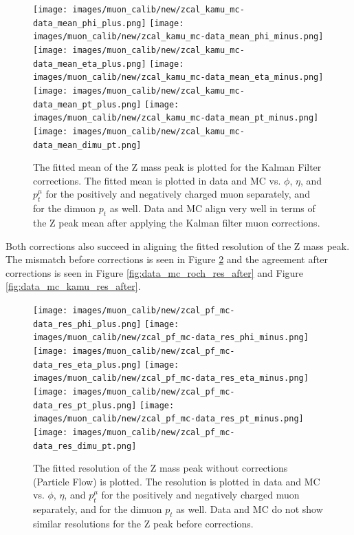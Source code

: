\begin{figure}[!h]
  \centering
  \texttt{[image: images/muon\_calib/new/zcal\_kamu\_mc-data\_mean\_phi\_plus.png]}
  \texttt{[image: images/muon\_calib/new/zcal\_kamu\_mc-data\_mean\_phi\_minus.png]}
  \texttt{[image: images/muon\_calib/new/zcal\_kamu\_mc-data\_mean\_eta\_plus.png]}
  \texttt{[image: images/muon\_calib/new/zcal\_kamu\_mc-data\_mean\_eta\_minus.png]}
  \texttt{[image: images/muon\_calib/new/zcal\_kamu\_mc-data\_mean\_pt\_plus.png]}
  \texttt{[image: images/muon\_calib/new/zcal\_kamu\_mc-data\_mean\_pt\_minus.png]}
  \texttt{[image: images/muon\_calib/new/zcal\_kamu\_mc-data\_mean\_dimu\_pt.png]}
  \caption[The Z mass peak mean and its alignment in data and MC after Kalman Filter corrections.]
   {The fitted mean of the Z mass peak is plotted for the Kalman Filter corrections. The fitted mean is plotted in data and MC vs. $\phi$, $\eta$, and $p_t^\mu$ for the positively and negatively charged muon separately, and for the dimuon $p_t$ as well. Data and MC align very well in terms of the Z peak mean after applying the Kalman filter muon corrections.}
  \label{fig:data_mc_kamu_mean_after}
\end{figure}
Both corrections also succeed in aligning the fitted resolution of the Z mass peak. The mismatch before corrections is seen in Figure \ref{fig:data_mc_res_before} and the agreement after corrections is seen in Figure \ref{fig:data_mc_roch_res_after} and Figure \ref{fig:data_mc_kamu_res_after}.
\begin{figure}[!h]
  \centering
  \texttt{[image: images/muon\_calib/new/zcal\_pf\_mc-data\_res\_phi\_plus.png]}
  \texttt{[image: images/muon\_calib/new/zcal\_pf\_mc-data\_res\_phi\_minus.png]}
  \texttt{[image: images/muon\_calib/new/zcal\_pf\_mc-data\_res\_eta\_plus.png]}
  \texttt{[image: images/muon\_calib/new/zcal\_pf\_mc-data\_res\_eta\_minus.png]}
  \texttt{[image: images/muon\_calib/new/zcal\_pf\_mc-data\_res\_pt\_plus.png]}
  \texttt{[image: images/muon\_calib/new/zcal\_pf\_mc-data\_res\_pt\_minus.png]}
  \texttt{[image: images/muon\_calib/new/zcal\_pf\_mc-data\_res\_dimu\_pt.png]}
  \caption[The uncalibrated Z mass peak resolution in data and MC.]
   {The fitted resolution of the Z mass peak without corrections (Particle Flow) is plotted. The resolution is plotted in data and MC vs. $\phi$, $\eta$, and $p_t^\mu$ for the positively and negatively charged muon separately, and for the dimuon $p_t$ as well. Data and MC do not show similar resolutions for the Z peak before corrections.}
  \label{fig:data_mc_res_before}
\end{figure}
